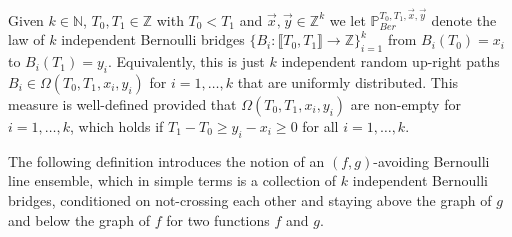 Given $k \in \mathbb{N}$, $T_0, T_1 \in \mathbb{Z}$ with $T_0 < T_1$ and $\vec{x}, \vec{y} \in \mathbb{Z}^k$ we let $\mathbb{P}^{T_0,T_1, \vec{x},\vec{y}}_{Ber}$ denote the law of $k$ independent Bernoulli bridges $\{B_i: \llbracket T_0, T_1 \rrbracket  \rightarrow \mathbb{Z} \}_{i = 1}^k$ from $B_i(T_0) = x_i$ to $B_i(T_1) = y_i$. Equivalently, this is just $k$ independent random up-right paths $B_i \in \Omega(T_0,T_1,x_i,y_i)$ for $i = 1, \dots, k$ that are uniformly distributed. This measure is well-defined provided that $\Omega(T_0,T_1,x_i,y_i)$ are non-empty for $i = 1, \dots, k$, which holds if $T_1 - T_0 \geq y_i - x_i \geq 0$ for all $i = 1, \dots, k$. 



The following definition introduces the notion of an $(f,g)$-avoiding Bernoulli line ensemble, which in simple terms is a collection of $k$ independent Bernoulli bridges, conditioned on not-crossing each other and staying above the graph of $g$ and below the graph of $f$ for two functions $f$ and $g$.
